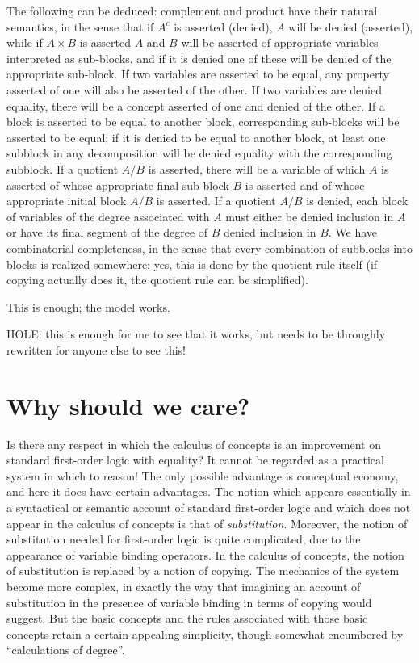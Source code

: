 \documentclass{article}
\begin{document}
The following can be deduced: complement and product have their
natural semantics, in the sense that if $A^c$ is asserted (denied),
$A$ will be denied (asserted), while if $A \times B$ is asserted $A$
and $B$ will be asserted of appropriate variables interpreted as
sub-blocks, and if it is denied one of these will be denied of the
appropriate sub-block.  If two variables are asserted to be equal, any
property asserted of one will also be asserted of the other.  If two
variables are denied equality, there will be a concept asserted of one
and denied of the other.  If a block is asserted to be equal to
another block, corresponding sub-blocks will be asserted to be equal;
if it is denied to be equal to another block, at least one subblock in
any decomposition will be denied equality with the corresponding
subblock.  If a quotient $A/B$ is asserted, there will be a variable
of which $A$ is asserted of whose appropriate final sub-block $B$ is
asserted and of whose appropriate initial block $A/B$ is asserted.  If
a quotient $A/B$ is denied, each block of variables of the degree
associated with $A$ must either be denied inclusion in $A$ or have its
final segment of the degree of $B$ denied inclusion in $B$.  We have
combinatorial completeness, in the sense that every combination of
subblocks into blocks is realized somewhere; yes, this is done by the
quotient rule itself (if copying actually does it, the quotient rule
can be simplified).

This is enough; the model works.

HOLE:  this is enough for me to see that it works, but needs to be
throughly rewritten for anyone else to see this!

\section{Why should we care?}

Is there any respect in which the calculus of concepts is an
improvement on standard first-order logic with equality?  It cannot be
regarded as a practical system in which to reason!  The only possible
advantage is conceptual economy, and here it does have certain
advantages.  The notion which appears essentially in a syntactical or
semantic account of standard first-order logic and which does not
appear in the calculus of concepts is that of {\em substitution\/}.
Moreover, the notion of substitution needed for first-order logic is
quite complicated, due to the appearance of variable binding
operators.  In the calculus of concepts, the notion of substitution is
replaced by a notion of copying.  The mechanics of the system become
more complex, in exactly the way that imagining an account of
substitution in the presence of variable binding in terms of copying
would suggest.  But the basic concepts and the rules associated with
those basic concepts retain a certain appealing simplicity, though
somewhat encumbered by ``calculations of degree''.
\end{document}
